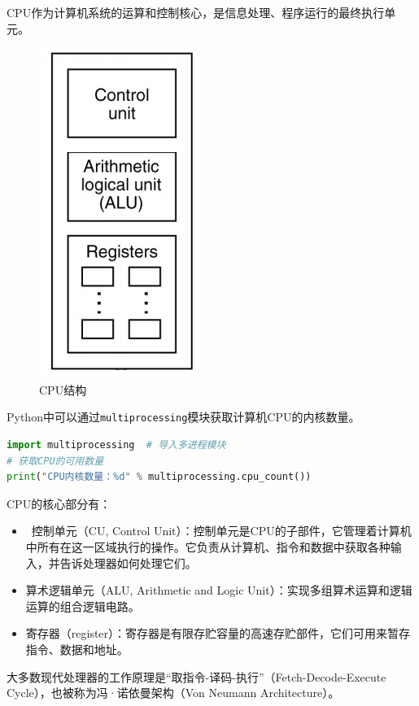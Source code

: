 CPU作为计算机系统的运算和控制核心，是信息处理、程序运行的最终执行单元。

\begin{figure}[H]
	\centering
	\includegraphics[scale=0.7]{img/C1/1-3/1.png}
	\caption{CPU结构}
\end{figure}

Python中可以通过\lstinline|multiprocessing|模块获取计算机CPU的内核数量。 \\

\begin{lstlisting}[language=Python]
import multiprocessing	# 导入多进程模块
# 获取CPU的可用数量
print("CPU内核数量：%d" % multiprocessing.cpu_count())
\end{lstlisting}

CPU的核心部分有：

\begin{itemize}
	\item  控制单元（CU, Control Unit）：控制单元是CPU的子部件，它管理着计算机中所有在这一区域执行的操作。它负责从计算机、指令和数据中获取各种输入，并告诉处理器如何处理它们。

	\item 算术逻辑单元（ALU, Arithmetic and Logic Unit）：实现多组算术运算和逻辑运算的组合逻辑电路。

	\item 寄存器（register）：寄存器是有限存贮容量的高速存贮部件，它们可用来暂存指令、数据和地址。
\end{itemize}

大多数现代处理器的工作原理是“取指令-译码-执行”（Fetch-Decode-Execute Cycle），也被称为冯·诺依曼架构（Von Neumann Architecture）。

